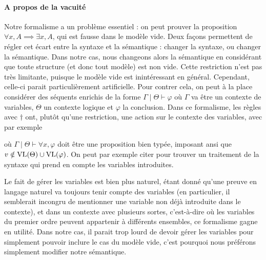 \paragraph{A propos de la vacuité}
Notre formalisme a un problème essentiel : on peut prouver la proposition
$\forall x, A \implies \exists x, A$, qui est fausse dans le modèle vide. Deux
façons permettent de régler cet écart entre la syntaxe et la sémantique :
changer la syntaxe, ou changer la sémantique. Dans notre cas, nous changeons
alors la sémantique en considérant que toute structure (et donc tout modèle)
est non vide. Cette restriction n'est pas très limitante, puisque le modèle vide
est inintéressant en général. Cependant, celle-ci parait particulièrement
artificielle. Pour contrer cela, on peut à la place considérer des séquents
enrichis de la forme $\Gamma\mid \Theta \vdash \varphi$ où $\Gamma$ va être un
contexte de variables, $\Theta$ un contexte logique et $\varphi$ la conclusion.
Dans ce formalisme, les règles avec $\dagger$ ont, plutôt qu'une restriction,
une action sur le contexte des variables, avec par exemple
\begin{prooftree}
\end{prooftree}
où $\Gamma\mid\Theta\vdash \forall x, \varphi$ doit être une proposition bien
typée, imposant ansi que $v\notin\VL(\Theta)\cup\VL(\varphi)$. On peut par
exemple citer \cite{JacobsCLTT} pour trouver un traitement de la syntaxe qui
prend en compte les variables introduites.

Le fait de gérer les variables est bien plus naturel, étant donné qu'une preuve
en langage naturel va toujours tenir compte des variables (en particulier, il
semblerait incongru de mentionner une variable non déjà introduite dans le
contexte), et dans un contexte avec plusieurs sortes, c'est-à-dire où les
variables du premier ordre peuvent appartenir à différents ensembles, ce
formalisme gagne en utilité. Dans notre cas, il parait trop lourd de devoir
gérer les variables pour simplement pouvoir inclure le cas du modèle vide,
c'est pourquoi nous préférons simplement modifier notre sémantique.

